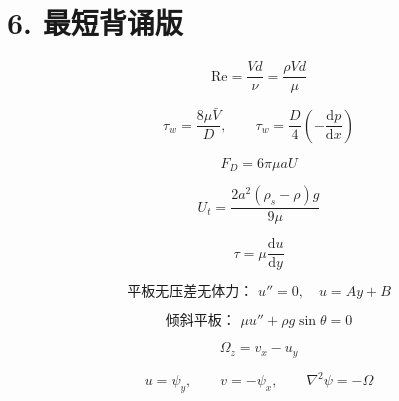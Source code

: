 ﻿\documentclass[12pt,a4paper]{ctexart}
\newcommand{\dd}{\mathrm d}
\newcommand{\Rey}{\mathrm{Re}}
\begin{document}
\section*{6. 最短背诵版}

\[
\boxed{
\Rey=\frac{Vd}{\nu}=\frac{\rho Vd}{\mu}
}
\]

\[
\boxed{
\tau_w=\frac{8\mu \bar V}{D},
\qquad
\tau_w=\frac{D}{4}\left(-\frac{\dd p}{\dd x}\right)
}
\]

\[
\boxed{
F_D=6\pi\mu aU
}
\]

\[
\boxed{
U_t=\frac{2a^2(\rho_s-\rho)g}{9\mu}
}
\]

\[
\boxed{
\tau=\mu\frac{\dd u}{\dd y}
}
\]

\[
\boxed{
\text{平板无压差无体力： }u''=0,\quad u=Ay+B
}
\]

\[
\boxed{
\text{倾斜平板： }\mu u''+\rho g\sin\theta=0
}
\]

\[
\boxed{
\Omega_z=v_x-u_y
}
\]

\[
\boxed{
u=\psi_y,\qquad v=-\psi_x,\qquad \nabla^2\psi=-\Omega
}
\]
\end{document}
